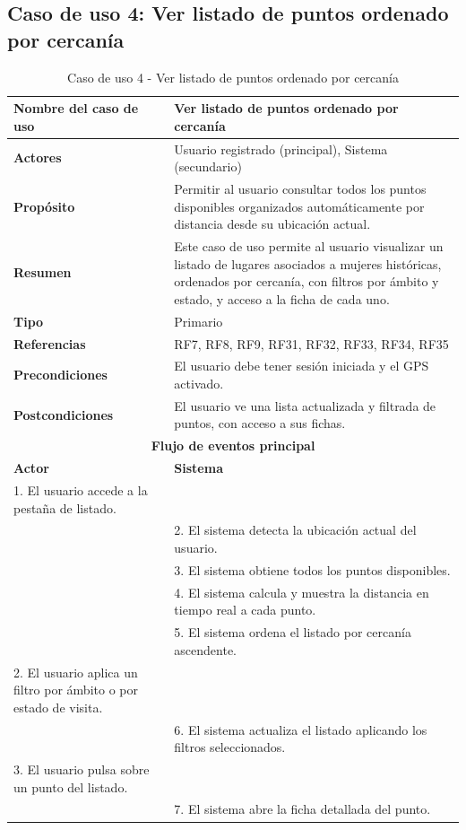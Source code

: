 \clearpage
\subsection{Caso de uso 4: Ver listado de puntos ordenado por cercanía}

\begin{table}[H]
\centering
\caption{Caso de uso 4 - Ver listado de puntos ordenado por cercanía}
\begin{tabular}{|p{4.5cm}|p{10.5cm}|}
\hline
\textbf{Nombre del caso de uso} & Ver listado de puntos ordenado por cercanía \\
\hline
\textbf{Actores} & Usuario registrado (principal), Sistema (secundario) \\
\hline
\textbf{Propósito} & Permitir al usuario consultar todos los puntos disponibles organizados automáticamente por distancia desde su ubicación actual. \\
\hline
\textbf{Resumen} & Este caso de uso permite al usuario visualizar un listado de lugares asociados a mujeres históricas, ordenados por cercanía, con filtros por ámbito y estado, y acceso a la ficha de cada uno. \\
\hline
\textbf{Tipo} & Primario \\
\hline
\textbf{Referencias} & RF7, RF8, RF9, RF31, RF32, RF33, RF34, RF35 \\
\hline
\textbf{Precondiciones} & El usuario debe tener sesión iniciada y el GPS activado. \\
\hline
\textbf{Postcondiciones} & El usuario ve una lista actualizada y filtrada de puntos, con acceso a sus fichas. \\
\hline
\multicolumn{2}{|c|}{\textbf{Flujo de eventos principal}} \\
\hline
\textbf{Actor} & \textbf{Sistema} \\
\hline
1. El usuario accede a la pestaña de listado. & \\
\hline
& 2. El sistema detecta la ubicación actual del usuario. \\
\hline
& 3. El sistema obtiene todos los puntos disponibles. \\
\hline
& 4. El sistema calcula y muestra la distancia en tiempo real a cada punto. \\
\hline
& 5. El sistema ordena el listado por cercanía ascendente. \\
\hline
2. El usuario aplica un filtro por ámbito o por estado de visita. & \\
\hline
& 6. El sistema actualiza el listado aplicando los filtros seleccionados. \\
\hline
3. El usuario pulsa sobre un punto del listado. & \\
\hline
& 7. El sistema abre la ficha detallada del punto. \\
\hline
\end{tabular}
\end{table}


